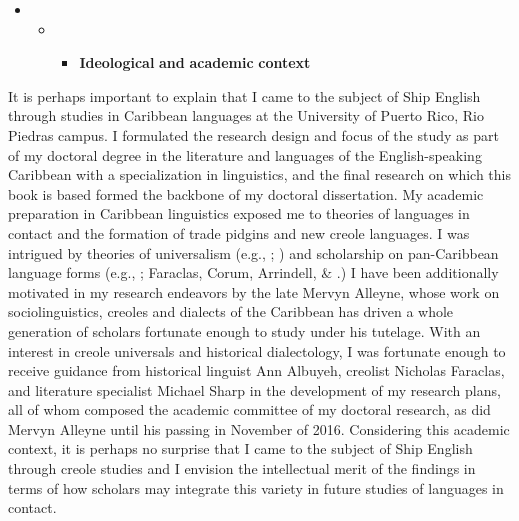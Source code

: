\begin{itemize}
\item \setcounter{itemize}{1}
\begin{itemize}
\item \setcounter{itemize}{1}
\begin{itemize}
\item \begin{styleNormali}
\textbf{Ideological} \textbf{and} \textbf{academic} \textbf{context}
\end{styleNormali}
\end{itemize}
\end{itemize}
\end{itemize}
\begin{styleNormali}
It is perhaps important to explain that I came to the subject of Ship English through studies in Caribbean languages at the University of Puerto Rico, Rio Piedras campus. I formulated the research design and focus of the study as part of my doctoral degree in the literature and languages of the English-speaking Caribbean with a specialization in linguistics, and the final research on which this book is based formed the backbone of my doctoral dissertation. My academic preparation in Caribbean linguistics exposed me to theories of languages in contact and the formation of trade pidgins and new creole languages. I was intrigued by theories of universalism (e.g., \citealt{MuyskenSmith1986}; \citealt{McWhorter2011}) and scholarship on pan-Caribbean language forms (e.g., \citealt{Allsopp2003}; Faraclas, Corum, Arrindell, \& \citealt{Ourdy2012}.) I have been additionally motivated in my research endeavors by the late Mervyn Alleyne, whose work on sociolinguistics, creoles and dialects of the Caribbean has driven a whole generation of scholars fortunate enough to study under his tutelage. With an interest in creole universals and historical dialectology, I was fortunate enough to receive guidance from historical linguist Ann Albuyeh, creolist Nicholas Faraclas, and literature specialist Michael Sharp in the development of my research plans, all of whom composed the academic committee of my doctoral research, as did Mervyn Alleyne until his passing in November of 2016. Considering this academic context, it is perhaps no surprise that I came to the subject of Ship English through creole studies and I envision the intellectual merit of the findings in terms of how scholars may integrate this variety in future studies of languages in contact.
\end{styleNormali}

